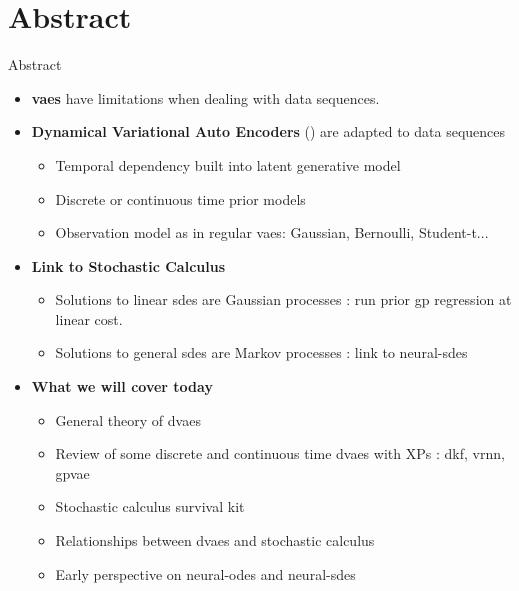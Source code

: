 \section{Abstract}\label{Abstract}

\begin{frame}{Abstract}
    \begin{itemize}
        \item <1-> \textbf{\glspl{vae}} have limitations when dealing with data sequences.
        \item <2-> \textbf{Dynamical Variational Auto Encoders} (\cite{girin_dynamical_2022}) are adapted to data sequences
            \begin{itemize}
                \item Temporal dependency built into latent generative model
                \item Discrete or continuous time prior models
                \item Observation model as in regular \glspl{vae}: Gaussian, Bernoulli, Student-t...
            \end{itemize}
        \item <3-> \textbf{Link to Stochastic Calculus}
            \begin{itemize}
                \item Solutions to linear \glspl{sde} are Gaussian processes : run prior \gls{gp} regression at linear cost.
                \item Solutions to general \glspl{sde} are Markov processes : link to \glspl{neural-sde}
            \end{itemize}
        \item <4-> \textbf{What we will cover today}
            \begin{itemize}
                \item General theory of \glspl{dvae}
                \item Review of some discrete and continuous time \glspl{dvae} with XPs : \gls{dkf}, \gls{vrnn}, \gls{gpvae}
                \item Stochastic calculus survival kit
                \item Relationships between \glspl{dvae} and stochastic calculus
                \item Early perspective on \glspl{neural-ode} and \glspl{neural-sde}
            \end{itemize}
    \end{itemize}
\end{frame}

